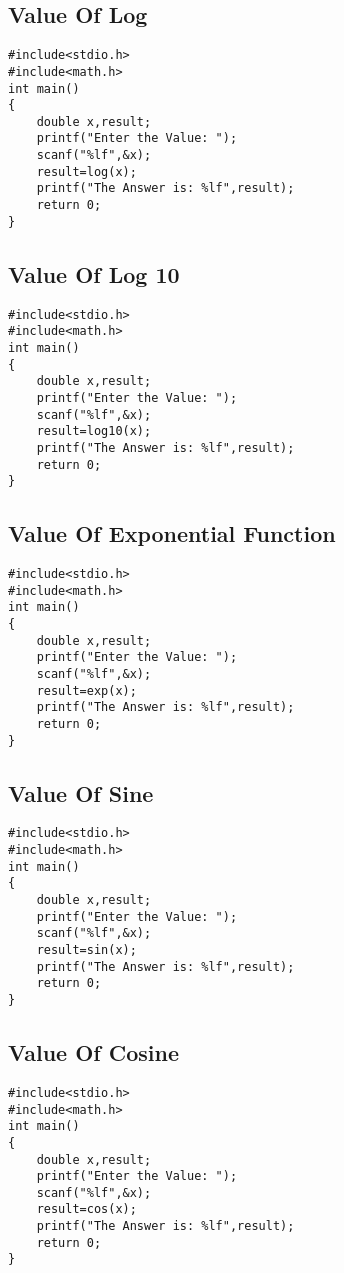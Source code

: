 \documentclass[a4paper,14pt]{article}
\begin{document}
\subsection{Value Of Log}
\vspace{0.5cm}
\begin{lstlisting}[caption={Value Of Log}]
#include<stdio.h>
#include<math.h>
int main()
{
    double x,result;
    printf("Enter the Value: ");
    scanf("%lf",&x);
    result=log(x);
    printf("The Answer is: %lf",result);
    return 0;
}
\end{lstlisting}
\newpage

\subsection{Value Of Log 10}
\vspace{0.5cm}
\begin{lstlisting}[caption={Value Of Log 10}]
#include<stdio.h>
#include<math.h>
int main()
{
    double x,result;
    printf("Enter the Value: ");
    scanf("%lf",&x);
    result=log10(x);
    printf("The Answer is: %lf",result);
    return 0;
}
\end{lstlisting}
\newpage

\subsection{Value Of Exponential Function}
\vspace{0.5cm}
\begin{lstlisting}[caption={Value Of Exponential Function}]
#include<stdio.h>
#include<math.h>
int main()
{
    double x,result;
    printf("Enter the Value: ");
    scanf("%lf",&x);
    result=exp(x);
    printf("The Answer is: %lf",result);
    return 0;
}
\end{lstlisting}
\newpage

\subsection{Value Of Sine}
\vspace{0.5cm}
\begin{lstlisting}[caption={Value Of Sine}]
#include<stdio.h>
#include<math.h>
int main()
{
    double x,result;
    printf("Enter the Value: ");
    scanf("%lf",&x);
    result=sin(x);
    printf("The Answer is: %lf",result);
    return 0;
}
\end{lstlisting}
\newpage

\subsection{Value Of Cosine}
\vspace{0.5cm}
\begin{lstlisting}[caption={Value Of Cosine}]
#include<stdio.h>
#include<math.h>
int main()
{
    double x,result;
    printf("Enter the Value: ");
    scanf("%lf",&x);
    result=cos(x);
    printf("The Answer is: %lf",result);
    return 0;
}
\end{lstlisting}
\newpage
\end{document}
